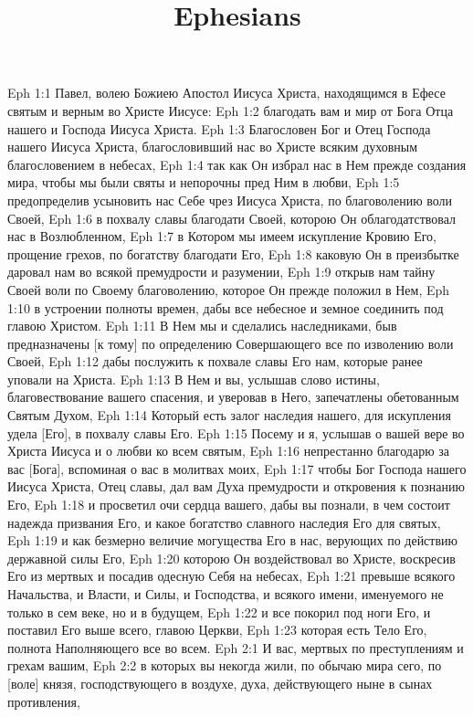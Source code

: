 

\title{Ephesians}

Eph 1:1  Павел, волею Божиею Апостол Иисуса Христа, находящимся в Ефесе святым и верным во Христе Иисусе:
Eph 1:2  благодать вам и мир от Бога Отца нашего и Господа Иисуса Христа.
Eph 1:3  Благословен Бог и Отец Господа нашего Иисуса Христа, благословивший нас во Христе всяким духовным благословением в небесах,
Eph 1:4  так как Он избрал нас в Нем прежде создания мира, чтобы мы были святы и непорочны пред Ним в любви,
Eph 1:5  предопределив усыновить нас Себе чрез Иисуса Христа, по благоволению воли Своей,
Eph 1:6  в похвалу славы благодати Своей, которою Он облагодатствовал нас в Возлюбленном,
Eph 1:7  в Котором мы имеем искупление Кровию Его, прощение грехов, по богатству благодати Его,
Eph 1:8  каковую Он в преизбытке даровал нам во всякой премудрости и разумении,
Eph 1:9  открыв нам тайну Своей воли по Своему благоволению, которое Он прежде положил в Нем,
Eph 1:10  в устроении полноты времен, дабы все небесное и земное соединить под главою Христом.
Eph 1:11  В Нем мы и сделались наследниками, быв предназначены [к тому] по определению Совершающего все по изволению воли Своей,
Eph 1:12  дабы послужить к похвале славы Его нам, которые ранее уповали на Христа.
Eph 1:13  В Нем и вы, услышав слово истины, благовествование вашего спасения, и уверовав в Него, запечатлены обетованным Святым Духом,
Eph 1:14  Который есть залог наследия нашего, для искупления удела [Его], в похвалу славы Его.
Eph 1:15  Посему и я, услышав о вашей вере во Христа Иисуса и о любви ко всем святым,
Eph 1:16  непрестанно благодарю за вас [Бога], вспоминая о вас в молитвах моих,
Eph 1:17  чтобы Бог Господа нашего Иисуса Христа, Отец славы, дал вам Духа премудрости и откровения к познанию Его,
Eph 1:18  и просветил очи сердца вашего, дабы вы познали, в чем состоит надежда призвания Его, и какое богатство славного наследия Его для святых,
Eph 1:19  и как безмерно величие могущества Его в нас, верующих по действию державной силы Его,
Eph 1:20  которою Он воздействовал во Христе, воскресив Его из мертвых и посадив одесную Себя на небесах,
Eph 1:21  превыше всякого Начальства, и Власти, и Силы, и Господства, и всякого имени, именуемого не только в сем веке, но и в будущем,
Eph 1:22  и все покорил под ноги Его, и поставил Его выше всего, главою Церкви,
Eph 1:23  которая есть Тело Его, полнота Наполняющего все во всем.
Eph 2:1  И вас, мертвых по преступлениям и грехам вашим,
Eph 2:2  в которых вы некогда жили, по обычаю мира сего, по [воле] князя, господствующего в воздухе, духа, действующего ныне в сынах противления,
